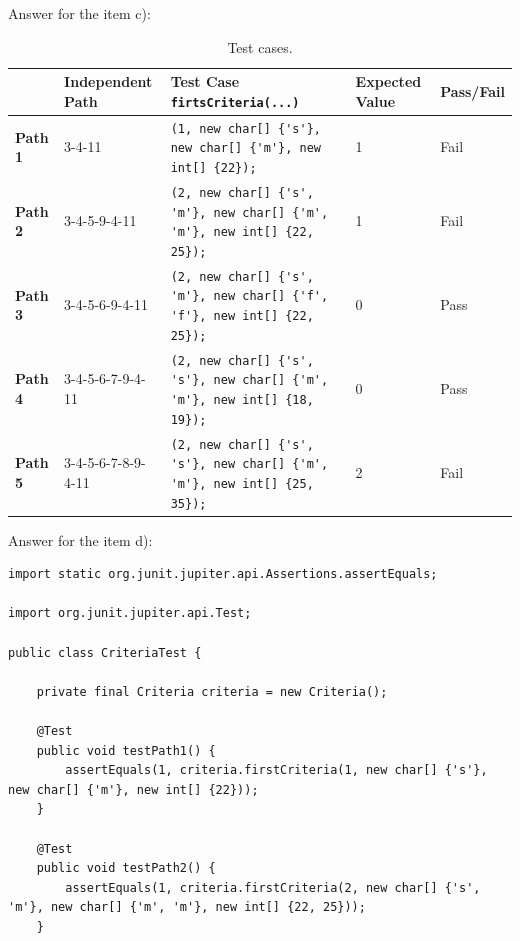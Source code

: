 \begin{solution}
    Answer for the item c):
    
    \begin{table}[H]
        \centering
        \renewcommand{\arraystretch}{1.2}
        \caption{Test cases.}
        \label{tab:e8-test-cases}
        \begin{adjustbox}{max width=\textwidth}
            \begin{tabular}{lllll}
                \toprule
                 & Independent Path & Test Case \lstinline!firtsCriteria(...)! & Expected Value & Pass/Fail\\
                \midrule
                \textbf{Path 1} & 3-4-11 & \lstinline!(1, new char[] {'s'}, new char[] {'m'}, new int[] {22});! & 1 & Fail\\
                \textbf{Path 2} & 3-4-5-9-4-11 & \lstinline!(2, new char[] {'s', 'm'}, new char[] {'m', 'm'}, new int[] {22, 25});! & 1 & Fail\\
                \textbf{Path 3} & 3-4-5-6-9-4-11 & \lstinline!(2, new char[] {'s', 'm'}, new char[] {'f', 'f'}, new int[] {22, 25});! & 0 & Pass\\
                \textbf{Path 4} & 3-4-5-6-7-9-4-11 & \lstinline!(2, new char[] {'s', 's'}, new char[] {'m', 'm'}, new int[] {18, 19});! & 0 & Pass\\
                \textbf{Path 5} & 3-4-5-6-7-8-9-4-11 & \lstinline!(2, new char[] {'s', 's'}, new char[] {'m', 'm'}, new int[] {25, 35});! & 2 & Fail\\
                \bottomrule
            \end{tabular}
        \end{adjustbox}
    \end{table}
    
    Answer for the item d):
    
    \begin{lstlisting}
import static org.junit.jupiter.api.Assertions.assertEquals;

import org.junit.jupiter.api.Test;

public class CriteriaTest {
	
    private final Criteria criteria = new Criteria();
    
    @Test
    public void testPath1() {
        assertEquals(1, criteria.firstCriteria(1, new char[] {'s'}, new char[] {'m'}, new int[] {22}));
    }
    
    @Test
    public void testPath2() {
        assertEquals(1, criteria.firstCriteria(2, new char[] {'s', 'm'}, new char[] {'m', 'm'}, new int[] {22, 25}));
    }
    

\end{lstlisting}
\end{solution}
